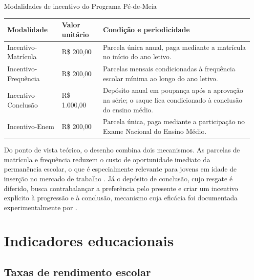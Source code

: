 \begin{quadro}[!htb]
    \centering
    \caption{Modalidades de incentivo do Programa Pé-de-Meia}
    \label{qua_incentivos}
    \small
    \begin{tabular}{|p{3.2cm}|C{2.4cm}|p{8.4cm}|}
        \hline
        \textbf{Modalidade} & \textbf{Valor unitário} & \textbf{Condição e periodicidade} \\
        \hline
        Incentivo-Matrícula & R\$ 200,00 & Parcela única anual, paga mediante a matrícula no início do ano letivo. \\
        \hline
        Incentivo-Frequência & R\$ 200,00 & Parcelas mensais condicionadas à frequência escolar mínima ao longo do ano letivo. \\
        \hline
        Incentivo-Conclusão & R\$ 1.000,00 & Depósito anual em poupança após a aprovação na série; o saque fica condicionado à conclusão do ensino médio. \\
        \hline
        Incentivo-Enem & R\$ 200,00 & Parcela única, paga mediante a participação no Exame Nacional do Ensino Médio. \\
        \hline
    \end{tabular}
\end{quadro}

Do ponto de vista teórico, o desenho combina dois mecanismos.
As parcelas de matrícula e frequência reduzem o custo de oportunidade imediato da permanência escolar, o que é especialmente relevante para jovens em idade de inserção no mercado de trabalho \cite{Fiszbein2009}.
Já o depósito de conclusão, cujo resgate é diferido, busca contrabalançar a preferência pelo presente e criar um incentivo explícito à progressão e à conclusão, mecanismo cuja eficácia foi documentada experimentalmente por .

\section{Indicadores educacionais}
\label{sec_indicadores}

\subsection{Taxas de rendimento escolar}
\label{subsec_taxas_rendimento}

